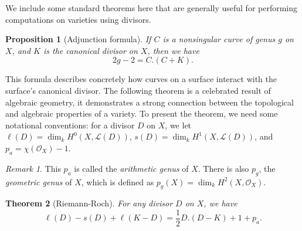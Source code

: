 \documentclass[12pt,twoside]{reedthesis}
\theoremstyle{plain}
\newtheorem{theorem}{Theorem}[chapter]
\newtheorem{proposition}[theorem]{Proposition}
\theoremstyle{definition}
\theoremstyle{remark}
\newtheorem{remark}{Remark}[section]
\newcommand{\calO}{\mathcal{O}}
\begin{document}
We include some standard theorems here that are generally useful for performing computations on varieties using divisors.
\begin{proposition}[Adjunction formula]
If $C$ is a nonsingular curve of genus $g$ on $X$, and $K$ is the canonical divisor on $X$, then we have
\[2g-2=C.(C+K).\]
\end{proposition}
\noindent This formula describes concretely how curves on a surface interact with the surface's canonical divisor.
The following theorem is a celebrated result of algebraic geometry, it demonstrates a strong connection between the topological and algebraic properties of a variety. To present the theorem, we need some notational conventions: for a divisor $D$ on $X$, we let $\ell(D)=\dim_k H^0(X,\mathcal{L}(D))$, $s(D)=\dim_k H^1(X,\mathcal{L}(D))$, and $p_a=\chi(\calO_X)-1$.
\begin{remark}
This $p_a$ is called the \emph{arithmetic genus} of $X$. There is also $p_g$, the \emph{geometric genus} of $X$, which is defined as $p_g(X)=\dim_k H^2(X,\calO_X)$.
\end{remark}
\begin{theorem}[Riemann-Roch]
For any divisor $D$ on $X$, we have \[\ell(D)-s(D)+\ell(K-D)=\frac{1}{2}D.(D-K)+1+p_a.\]
\end{theorem}
\end{document}
